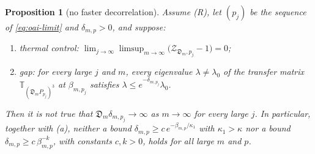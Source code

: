 \documentclass[11pt,a4paper]{amsart}
\newtheorem{proposition}[theorem]{Proposition}
\theoremstyle{definition}
\theoremstyle{remark}
\numberwithin{equation}{section}
\newcommand{\TT}{\mathbb{T}}               %
\newcommand{\Zc}{\mathcal{Z}}              %
\newcommand{\lzero}{\lambda_0}             %
\newcommand{\Den}{\mathfrak D}            %
\begin{document}
\begin{proposition}[no faster decorrelation]\label{prop:constructed-rate}
Assume \textup{(R)}, let $(p_j)$ be the sequence of \eqref{eq:oai-limit} and $\delta_{m,p}>0$, and suppose:
\begin{enumerate}[label=\textup{(\alph*)},leftmargin=*]
\item \emph{thermal control}: $\lim_{j\to\infty}\limsup_{m\to\infty}\bigl(\Zc_{\Den_m,p_j}-1\bigr)=0$;
\item \emph{gap}: for every large $j$ and $m$, every eigenvalue $\lambda\ne\lzero$ of the transfer matrix $\TT_{(\Den_mP_{p_j})^3}$ at $\beta_{m,p_j}$ satisfies $\lambda\le e^{-\delta_{m,p_j}}\lzero$.
\end{enumerate}
Then it is not true that $\Den_m\delta_{m,p_j}\to\infty$ as $m\to\infty$ for every large $j$. In particular, together with \textup{(a)}, neither a bound $\delta_{m,p}\ge c\,e^{-\beta_{m,p}/\kappa_1}$ with $\kappa_1>\kappa$ nor a bound $\delta_{m,p}\ge c\,\beta_{m,p}^{-k}$, with constants $c,k>0$, holds for all large $m$ and $p$.
\end{proposition}
\end{document}
